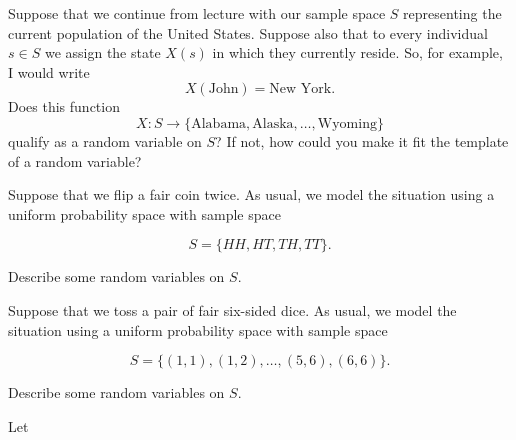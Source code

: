\documentclass[12pt,reqno]{amsart}
\begin{document}
\bigskip

\prob Suppose that we continue from lecture with our sample space $S$ representing the current population of the United States. Suppose also that to every individual $s\in S$ we assign the state $X(s)$ in which they currently reside. So, for example, I would write
    \[X(\text{John}) = \text{New York}.\]
Does this function
    \[X: S \to \{\text{Alabama}, \text{Alaska},\ldots,\text{Wyoming}\} \]
qualify as a random variable on $S$? If not, how could you make it fit the template of a random variable?\vfill


















\bigskip
\prob Suppose that we flip a fair coin twice. As usual, we model the situation using a uniform probability space with sample space

    \[S = \{ HH, HT, TH, TT\}.\]

Describe some random variables on $S$.\vfill



















\bigskip

\prob Suppose that we toss a pair of fair six-sided dice. As usual, we model the situation using a uniform probability space with sample space

    \[S = \{(1,1),(1,2),\ldots,(5,6),(6,6)\}.\]

Describe some random variables on $S$.\vfill

























\newpage
\prob Let
\end{document}
